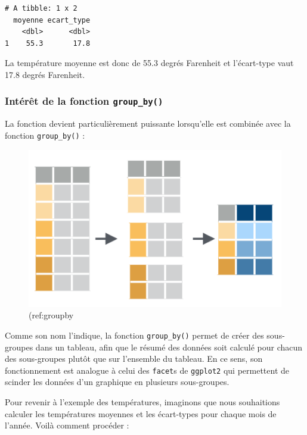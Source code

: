 \documentclass[a4paperpaper,]{article}
\theoremstyle{definition}
\theoremstyle{definition}
\theoremstyle{definition}
\theoremstyle{remark}
\begin{document}
\begin{verbatim}
# A tibble: 1 x 2
  moyenne ecart_type
    <dbl>      <dbl>
1    55.3       17.8
\end{verbatim}

La température moyenne est donc de 55.3 degrés Farenheit et l'écart-type
vaut 17.8 degrés Farenheit.

\hypertarget{interet-de-la-fonction-group_by}{%
\subsubsection{\texorpdfstring{Intérêt de la fonction
\texttt{group\_by()}}{Intérêt de la fonction group\_by()}}\label{interet-de-la-fonction-group_by}}

La fonction devient particulièrement puissante lorsqu'elle est combinée
avec la fonction \texttt{group\_by()} :

\begin{figure}[htpb]

{\centering \includegraphics[width=0.65\linewidth]{images/groupby} 

}

\caption{(ref:groupby}\label{fig:groupby}
\end{figure}





Comme son nom l'indique, la fonction \texttt{group\_by()} permet de
créer des sous-groupes dans un tableau, afin que le résumé des données
soit calculé pour chacun des sous-groupes plutôt que sur l'ensemble du
tableau. En ce sens, son fonctionnement est analogue à celui des
\texttt{facet}s de \texttt{ggplot2} qui permettent de scinder les
données d'un graphique en plusieurs sous-groupes.

Pour revenir à l'exemple des températures, imaginons que nous
souhaitions calculer les températures moyennes et les écart-types pour
chaque mois de l'année. Voilà comment procéder :
\end{document}
